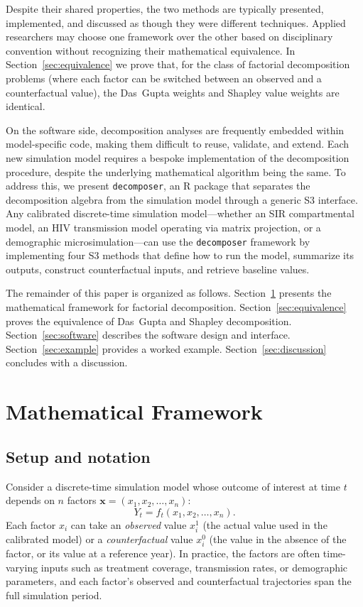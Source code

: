 \documentclass[11pt]{article}
\newcommand{\pkg}[1]{\texttt{#1}}
\newcommand{\R}{\textsf{R}}
\begin{document}
Despite their shared properties, the two methods are typically presented,
implemented, and discussed as though they were different techniques.
Applied researchers may choose one framework over the other based on
disciplinary convention without recognizing their mathematical
equivalence.
In Section~\ref{sec:equivalence} we prove that, for the class of
factorial decomposition problems (where each factor can be switched
between an observed and a counterfactual value), the Das~Gupta weights
and Shapley value weights are identical.

On the software side, decomposition analyses are frequently embedded
within model-specific code, making them difficult to reuse, validate,
and extend.
Each new simulation model requires a bespoke implementation of the
decomposition procedure, despite the underlying mathematical algorithm
being the same.
To address this, we present \pkg{decomposer}, an \R{} package that
separates the decomposition algebra from the simulation model through a
generic S3 interface.
Any calibrated discrete-time simulation model---whether an SIR
compartmental model, an HIV transmission model operating via matrix
projection, or a demographic microsimulation---can use the
\pkg{decomposer} framework by implementing four S3 methods that define
how to run the model, summarize its outputs, construct counterfactual
inputs, and retrieve baseline values.

The remainder of this paper is organized as follows.
Section~\ref{sec:framework} presents the mathematical framework for
factorial decomposition.
Section~\ref{sec:equivalence} proves the equivalence of Das~Gupta and
Shapley decomposition.
Section~\ref{sec:software} describes the software design and interface.
Section~\ref{sec:example} provides a worked example.
Section~\ref{sec:discussion} concludes with a discussion.


\section{Mathematical Framework}
\label{sec:framework}

\subsection{Setup and notation}

Consider a discrete-time simulation model whose outcome of interest at
time $t$ depends on $n$ factors
$\mathbf{x} = (x_1, x_2, \ldots, x_n)$:
\[
  Y_t = f_t(x_1, x_2, \ldots, x_n).
\]
Each factor $x_i$ can take an \emph{observed} value $x_i^1$ (the actual
value used in the calibrated model) or a \emph{counterfactual} value
$x_i^0$ (the value in the absence of the factor, or its value at a
reference year).
In practice, the factors are often time-varying inputs such as treatment
coverage, transmission rates, or demographic parameters, and each
factor's observed and counterfactual trajectories span the full
simulation period.
\end{document}
